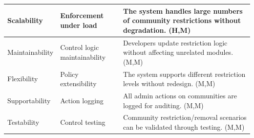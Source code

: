 \documentclass{article}
\begin{document}
\begin{table}[H]
\begin{tabular}{|p{3cm}|p{4cm}|p{7cm}|}
        Scalability
                                   & Enforcement under load
                                   & The system handles large numbers of community restrictions without degradation. (H,M)                                       \\
        \hline

        Maintainability
                                   & Control logic maintainability
                                   & Developers update restriction logic without affecting unrelated modules. (M,M)                                              \\
        \hline

        Flexibility
                                   & Policy extensibility
                                   & The system supports different restriction levels without redesign. (M,M)                                                    \\
        \hline

        Supportability
                                   & Action logging
                                   & All admin actions on communities are logged for auditing. (M,M)                                                             \\
        \hline

        Testability
                                   & Control testing
                                   & Community restriction/removal scenarios can be validated through testing. (M,M)                                             \\
        \hline
    \end{tabular}
\end{table}
\end{document}
